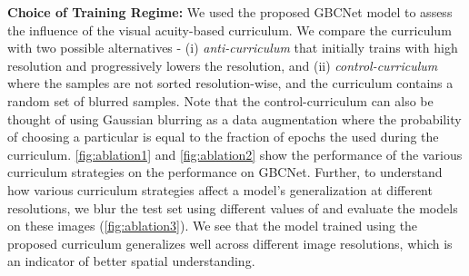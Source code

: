 \documentclass[10pt,twocolumn,letterpaper]{article}
\newcommand{\myfirstpara}[1]{\noindent \textbf{#1:}}
\newcommand{\mypara}[1]{\vspace{0.1em} \myfirstpara{#1}}
\begin{document}
\mypara{Choice of Training Regime}
We used the proposed GBCNet model to assess the influence of the visual acuity-based curriculum. We compare the curriculum with two possible alternatives - (i) \emph{anti-curriculum} that initially trains with high resolution and progressively lowers the resolution, and (ii) \emph{control-curriculum} where the samples are not sorted resolution-wise, and the curriculum contains a random set of blurred samples. Note that the control-curriculum can also be thought of using Gaussian blurring as a data augmentation where the probability of choosing a particular  is equal to the fraction of epochs the  used during the curriculum. \cref{fig:ablation1} and \ref{fig:ablation2} show the performance of the various curriculum strategies on the performance on GBCNet.  Further, to understand how various curriculum strategies affect a model's generalization at different resolutions, we blur the test set using different values of  and evaluate the models on these images (\cref{fig:ablation3}). 
We see that the model trained using the proposed curriculum generalizes well across different image resolutions, which is an indicator of better spatial understanding.
\end{document}
